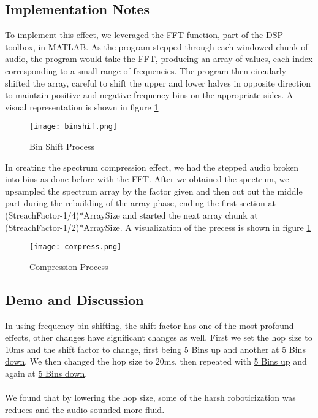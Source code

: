 \subsection{Implementation Notes}
To implement this effect, we leveraged the FFT function, part of the DSP toolbox, in MATLAB. As the program stepped through each windowed chunk of audio, the program would take the FFT, producing an array of values, each index corresponding to a small range of frequencies. The program then circularly shifted the array, careful to shift the upper and lower halves in opposite direction to maintain positive and negative frequency bins on the appropriate sides. A visual representation is shown in figure \ref{fig:bin-shift-block-diagram}

\begin{figure}[ht]
	\centering
	\texttt{[image: binshif.png]}
	\caption{Bin Shift Process}
	\label{fig:bin-shift-block-diagram}
\end{figure}

In creating the spectrum compression effect, we had the stepped audio broken into bins as done before with the FFT. After we obtained the spectrum, we upsampled the spectrum array by the factor given and then cut out the middle part during the rebuilding of the array phase, ending the first section at (StreachFactor-1/4)*ArraySize and started the next array chunk at (StreachFactor-1/2)*ArraySize. A visualization of the precess is shown in figure \ref{fig:bin-shift-block-diagram}

\begin{figure}[ht]
	\centering
	\texttt{[image: compress.png]}
	\caption{Compression Process}
	\label{fig:compress-block-diagram}
\end{figure}


\subsection{Demo and Discussion}
In using frequency bin shifting, the shift factor has one of the most profound effects, other changes have significant changes as well. First we set the hop size to 10ms and the shift factor to change, first being
\href{run:../OutputAudio/FreqBinShift_22-001 Original Vocal_{N=10ms}{h=0.25}{s=5}.wav}{5 Bins up}
and another at
\href{run:../OutputAudio/FreqBinShift_22-001 Original Vocal_{N=10ms}{h=0.25}{s=-5}.wav}{5 Bins down}.
We then changed the hop size to 20ms, then repeated with 
\href{run:../OutputAudio/FreqBinShift_22-001 Original Vocal_{N=20ms}{h=0.25}{s=5}.wav}{5 Bins up}
and again at
\href{run:../OutputAudio/FreqBinShift_22-001 Original Vocal_{N=20ms}{h=0.25}{s=-5}.wav}{5 Bins down}.
\\ \\
We found that by lowering the hop size, some of the harsh roboticization was reduces and the audio sounded more fluid.

